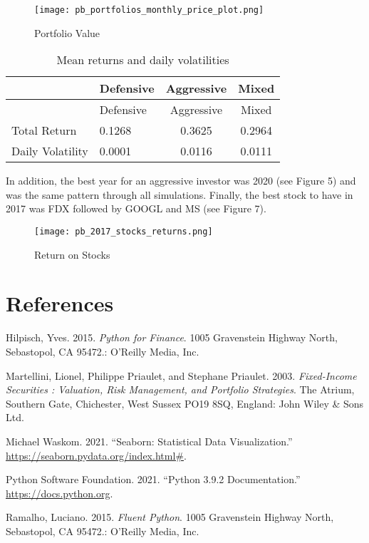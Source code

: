 \documentclass[
  11pt,
]{article}
\begin{document}
\begin{figure}
\centering
\texttt{[image: pb\_portfolios\_monthly\_price\_plot.png]}
\caption{Portfolio Value}
\end{figure}

\begin{longtable}[]{@{}llcc@{}}
\caption{\label{tab:unnamed-chunk-6}Mean returns and daily volatilities}\tabularnewline
\toprule
& Defensive & Aggressive & Mixed\tabularnewline
\midrule
\endfirsthead
\toprule
& Defensive & Aggressive & Mixed\tabularnewline
\midrule
\endhead
Total Return & 0.1268 & 0.3625 & 0.2964\tabularnewline
Daily Volatility & 0.0001 & 0.0116 & 0.0111\tabularnewline
\bottomrule
\end{longtable}

In addition, the best year for an aggressive investor was 2020 (see Figure 5) and was the same pattern through all simulations. Finally, the best stock to have in 2017 was FDX followed by GOOGL and MS (see Figure 7).

\begin{figure}
\centering
\texttt{[image: pb\_2017\_stocks\_returns.png]}
\caption{Return on Stocks}
\end{figure}

\hypertarget{references}{%
\section*{References}\label{references}}

\hypertarget{refs}{}
\leavevmode\hypertarget{ref-finpy}{}%
Hilpisch, Yves. 2015. \emph{Python for Finance}. 1005 Gravenstein Highway North, Sebastopol, CA 95472.: O'Reilly Media, Inc.

\leavevmode\hypertarget{ref-secur}{}%
Martellini, Lionel, Philippe Priaulet, and Stephane Priaulet. 2003. \emph{Fixed-Income Securities : Valuation, Risk Management, and Portfolio Strategies}. The Atrium, Southern Gate, Chichester, West Sussex PO19 8SQ, England: John Wiley \& Sons Ltd.

\leavevmode\hypertarget{ref-seaborn}{}%
Michael Waskom. 2021. ``Seaborn: Statistical Data Visualization.'' \url{https://seaborn.pydata.org/index.html\#}.

\leavevmode\hypertarget{ref-docpy}{}%
Python Software Foundation. 2021. ``Python 3.9.2 Documentation.'' \url{https://docs.python.org}.

\leavevmode\hypertarget{ref-fpy}{}%
Ramalho, Luciano. 2015. \emph{Fluent Python}. 1005 Gravenstein Highway North, Sebastopol, CA 95472.: O'Reilly Media, Inc.
\end{document}
